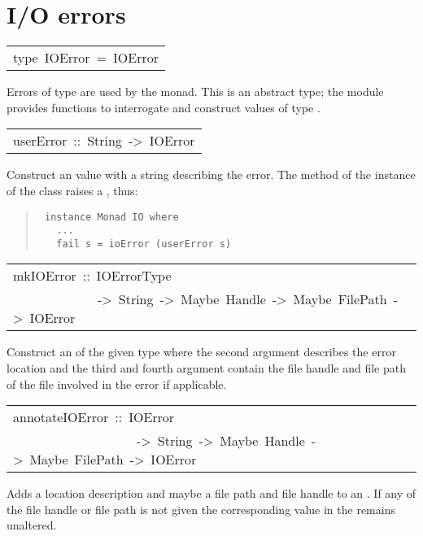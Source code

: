 \section{I/O errors
}
\begin{haddockdesc}
\item[\begin{tabular}{@{}l}
type\ IOError\ =\ IOError
\end{tabular}]\haddockbegindoc
Errors of type  are used by the  monad.  This is an
 abstract type; the module  provides functions to
 interrogate and construct values of type .
\par

\end{haddockdesc}
\begin{haddockdesc}
\item[\begin{tabular}{@{}l}
userError\ ::\ String\ ->\ IOError
\end{tabular}]\haddockbegindoc
Construct an  value with a string describing the error.
 The  method of the  instance of the  class raises a
 , thus:
\par
\begin{quote}
{\haddockverb\begin{verbatim}
 instance Monad IO where 
   ...
   fail s = ioError (userError s)
\end{verbatim}}
\end{quote}

\end{haddockdesc}
\begin{haddockdesc}
\item[\begin{tabular}{@{}l}
mkIOError\ ::\ IOErrorType\\\ \ \ \ \ \ \ \ \ \ \ \ \ ->\ String\ ->\ Maybe\ Handle\ ->\ Maybe\ FilePath\ ->\ IOError
\end{tabular}]\haddockbegindoc
Construct an  of the given type where the second argument
 describes the error location and the third and fourth argument
 contain the file handle and file path of the file involved in the
 error if applicable.
\par

\end{haddockdesc}
\begin{haddockdesc}
\item[\begin{tabular}{@{}l}
annotateIOError\ ::\ IOError\\\ \ \ \ \ \ \ \ \ \ \ \ \ \ \ \ \ \ \ ->\ String\ ->\ Maybe\ Handle\ ->\ Maybe\ FilePath\ ->\ IOError
\end{tabular}]\haddockbegindoc
Adds a location description and maybe a file path and file handle
 to an .  If any of the file handle or file path is not given
 the corresponding value in the  remains unaltered.
\par

\end{haddockdesc}

